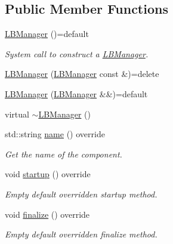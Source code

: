 \subsection*{Public Member Functions}
\begin{DoxyCompactItemize}
\item 
\hyperlink{structvt_1_1vrt_1_1collection_1_1balance_1_1_l_b_manager_a4adad6931af7d5ff2cb983859ed939f3}{L\+B\+Manager} ()=default
\begin{DoxyCompactList}\small\item\em System call to construct a {\ttfamily \hyperlink{structvt_1_1vrt_1_1collection_1_1balance_1_1_l_b_manager}{L\+B\+Manager}}. \end{DoxyCompactList}\item 
\hyperlink{structvt_1_1vrt_1_1collection_1_1balance_1_1_l_b_manager_af361eb6d3fa35d04873fcbe74b315d4a}{L\+B\+Manager} (\hyperlink{structvt_1_1vrt_1_1collection_1_1balance_1_1_l_b_manager}{L\+B\+Manager} const \&)=delete
\item 
\hyperlink{structvt_1_1vrt_1_1collection_1_1balance_1_1_l_b_manager_ab5efdf949166922f70cb49d171bf509a}{L\+B\+Manager} (\hyperlink{structvt_1_1vrt_1_1collection_1_1balance_1_1_l_b_manager}{L\+B\+Manager} \&\&)=default
\item 
virtual \hyperlink{structvt_1_1vrt_1_1collection_1_1balance_1_1_l_b_manager_aacec3c4ef45a173eae443722b2620d13}{$\sim$\+L\+B\+Manager} ()
\item 
std\+::string \hyperlink{structvt_1_1vrt_1_1collection_1_1balance_1_1_l_b_manager_a8e18e972cf9e8658da9577d45e090698}{name} () override
\begin{DoxyCompactList}\small\item\em Get the name of the component. \end{DoxyCompactList}\item 
void \hyperlink{structvt_1_1vrt_1_1collection_1_1balance_1_1_l_b_manager_add5427abf4c6e21e39f581635997ddac}{startup} () override
\begin{DoxyCompactList}\small\item\em Empty default overridden startup method. \end{DoxyCompactList}\item 
void \hyperlink{structvt_1_1vrt_1_1collection_1_1balance_1_1_l_b_manager_a29f02da15bb40857ad425cec22758ac9}{finalize} () override
\begin{DoxyCompactList}\small\item\em Empty default overridden finalize method. \end{DoxyCompactList}\item 

\end{DoxyCompactItemize}
